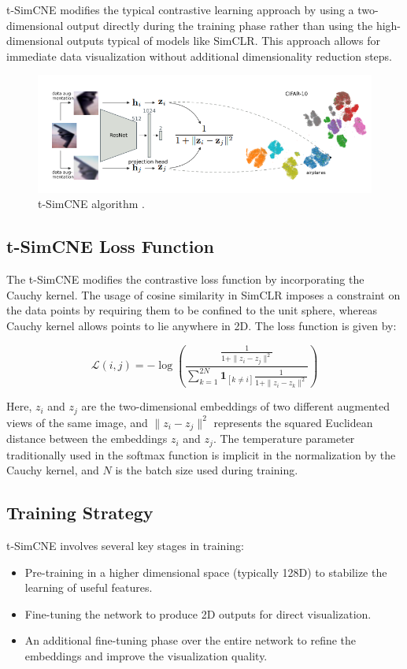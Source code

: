 t-SimCNE modifies the typical contrastive learning approach by using a two-dimensional output directly during the training phase rather than using the high-dimensional outputs typical of models like SimCLR. This approach allows for immediate data visualization without additional dimensionality reduction steps.

\begin{figure}[hbt]
\centering
\includegraphics[width=\textwidth]{figs/tsimcne_architecture.png}
\caption{
t-SimCNE algorithm \cite{tsimcne}.
}
\label{fig:secex}
\end{figure}

\subsection{t-SimCNE Loss Function}
The t-SimCNE modifies the contrastive loss function by incorporating the Cauchy kernel. The usage of cosine similarity in SimCLR imposes a constraint on the data points by requiring them to be confined to the unit sphere, whereas Cauchy kernel allows points to lie anywhere in 2D. The loss function is given by:

\begin{equation}
\mathcal{L}(i, j) = -\log \left(\frac{\frac{1}{1 + \|z_i - z_j\|^2}}{\sum_{k=1}^{2N} \mathbf{1}_{[k \neq i]} \frac{1}{1 + \|z_i - z_k\|^2}}\right)
\end{equation}

Here, $z_i$ and $z_j$ are the two-dimensional embeddings of two different augmented views of the same image, and $\|z_i - z_j\|^2$ represents the squared Euclidean distance between the embeddings $z_i$ and $z_j$. The temperature parameter traditionally used in the softmax function is implicit in the normalization by the Cauchy kernel, and $N$ is the batch size used during training.


\subsection{Training Strategy}
t-SimCNE involves several key stages in training:
\begin{itemize}
    \item Pre-training in a higher dimensional space (typically 128D) to stabilize the learning of useful features.
    \item Fine-tuning the network to produce 2D outputs for direct visualization.
    \item An additional fine-tuning phase over the entire network to refine the embeddings and improve the visualization quality.
\end{itemize}


